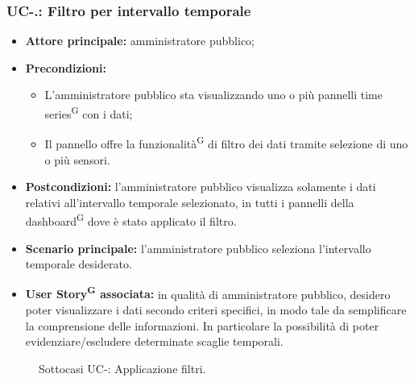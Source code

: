 \documentclass[8pt]{article}
\newcommand{\glossterm}[1]{#1\textsuperscript{G}} %
\begin{document}
\subsubsection*{UC-\theuc .\speconenumber: Filtro per intervallo temporale}
\begin{itemize}
    \item \textbf{Attore principale:} amministratore pubblico;
    \item \textbf{Precondizioni:}
    \begin{itemize}
        \item L’amministratore pubblico sta visualizzando uno o più pannelli \glossterm{time series} con i dati;
        \item Il pannello offre la \glossterm{funzionalità} di filtro dei dati tramite selezione di uno o più sensori.
    \end{itemize}
    \item \textbf{Postcondizioni:} l’amministratore pubblico visualizza solamente i dati relativi all’intervallo
temporale selezionato, in tutti i pannelli della \glossterm{dashboard} dove è stato applicato il filtro.
    \item \textbf{Scenario principale: }l’amministratore pubblico seleziona l’intervallo temporale desiderato.
    \item \textbf{\glossterm{User Story} associata:} in qualità di amministratore pubblico, desidero poter
        visualizzare i dati secondo criteri specifici, in modo tale da semplificare la comprensione
        delle informazioni. In particolare la possibilità di poter evidenziare/escludere determinate
        scaglie temporali.
\end{itemize}
\begin{figure}[ht!]
    \centering
    \caption{Sottocasi UC-\theuc: Applicazione filtri.}
    \label{fig:Sottocasi UC-\theuc: Applicazione filtri}
\end{figure}
\end{document}
